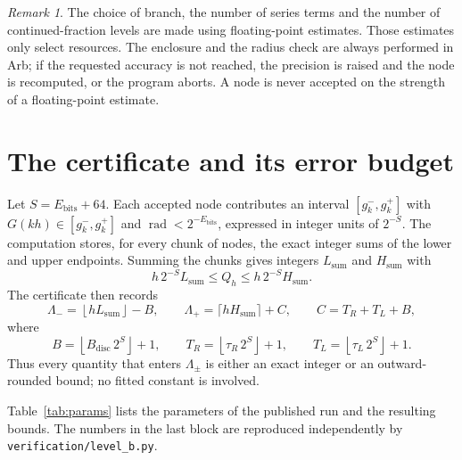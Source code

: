 \documentclass[11pt,a4paper]{article}
\theoremstyle{remark}
\newtheorem*{remark}{Remark}
\newcommand{\floor}[1]{\left\lfloor #1 \right\rfloor}
\DeclareMathOperator{\rad}{rad}
\begin{document}
\begin{remark}
The choice of branch, the number of series terms and the number of
continued-fraction levels are made using floating-point estimates.
Those estimates only select resources. The enclosure and the radius
check are always performed in Arb; if the requested accuracy is not
reached, the precision is raised and the node is recomputed, or the
program aborts. A node is never accepted on the strength of a
floating-point estimate.
\end{remark}

\section{The certificate and its error budget}

Let $S=E_{\mathrm{bits}}+64$. Each accepted node contributes an interval
$[g_k^-,g_k^+]$ with $G(kh)\in[g_k^-,g_k^+]$ and
$\rad<2^{-E_{\mathrm{bits}}}$, expressed in integer units of $2^{-S}$.
The computation stores, for every chunk of nodes, the exact integer sums
of the lower and upper endpoints. Summing the chunks gives integers
$L_{\mathrm{sum}}$ and $H_{\mathrm{sum}}$ with
\begin{equation}
  h\,2^{-S}L_{\mathrm{sum}}\le Q_h\le h\,2^{-S}H_{\mathrm{sum}} .
\end{equation}
The certificate then records
\begin{equation}
  \Lambda_-=\floor{hL_{\mathrm{sum}}}-B,\qquad
  \Lambda_+=\lceil hH_{\mathrm{sum}}\rceil+C,\qquad
  C=T_R+T_L+B,
  \label{eq:cert}
\end{equation}
where
\begin{equation}
  B=\floor{B_{\mathrm{disc}}\,2^S}+1,\qquad
  T_R=\floor{\tau_R\,2^S}+1,\qquad
  T_L=\floor{\tau_L\,2^S}+1 .
\end{equation}
Thus every quantity that enters $\Lambda_\pm$ is either an exact integer
or an outward-rounded bound; no fitted constant is involved.

Table~\ref{tab:params} lists the parameters of the published run and the
resulting bounds. The numbers in the last block are reproduced
independently by \texttt{verification/level\_b.py}.
\end{document}
